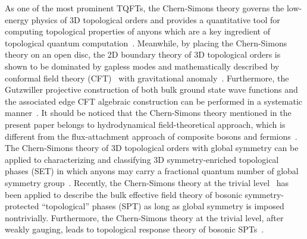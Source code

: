 \documentclass[11pt,nofootinbib,preprint]{revtex4-1}
\begin{document}
As one of the most prominent   TQFTs, the Chern-Simons theory governs the low-energy physics of $3$D topological orders and provides a quantitative tool for computing topological properties of anyons which are a key ingredient of topological quantum computation~\cite{sarma_08_TQC}. Meanwhile, by placing the Chern-Simons theory on an open disc, the 2D boundary theory of 3D topological orders is shown to be dominated by gapless modes and mathematically described by conformal field theory (CFT)~\cite{moore1989classical} with  gravitational anomaly~\cite{Wen_grav_prd2013,string8}.  Furthermore, the Gutzwiller projective construction of both  bulk ground state wave functions and the associated edge CFT algebraic construction can be performed in a systematic manner~\cite{Wen99,Barkeshli2010,barkeshli_wen}.  It should be noticed that the Chern-Simons theory mentioned in the present paper belongs to  hydrodynamical field-theoretical approach, which is different from the flux-attachment   approach of composite bosons and fermions~\cite{composite_Jain_2,composite_Fradkin,PhysRevLett.62.82}. The Chern-Simons theory of 3D topological orders with global symmetry can be applied to characterizing and classifying 3D symmetry-enriched topological phases (SET) in which anyons may carry a fractional quantum number of global symmetry group~\cite{PhysRevB.93.155121,PhysRevB.87.195103}. Recently, the Chern-Simons theory at the trivial level~\cite{PhysRevB.86.125119,YW12,PhysRevB.93.115136,Ye14b}  has been   applied to describe the bulk effective field theory of bosonic symmetry-protected ``topological'' phases (SPT) as long as global symmetry is imposed nontrivially. Furthermore, the Chern-Simons theory at the trivial level, after weakly gauging, leads to   topological response theory of bosonic SPTs~\cite{PhysRevLett.112.141602,Hung_Wen_gauge}.  
\end{document}
